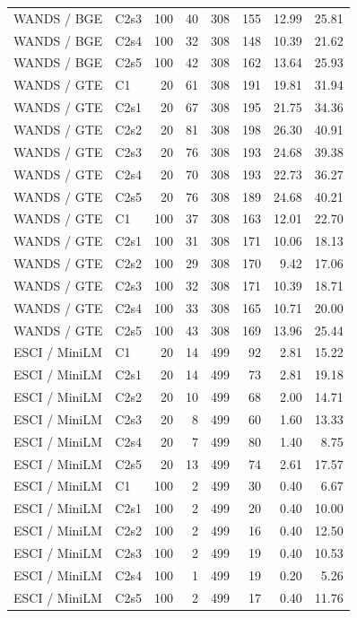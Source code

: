 \begin{longtable}{llrrrrrr}
WANDS / BGE & C2s3 & 100 & 40 & 308 & 155 & 12.99 & 25.81 \\
WANDS / BGE & C2s4 & 100 & 32 & 308 & 148 & 10.39 & 21.62 \\
WANDS / BGE & C2s5 & 100 & 42 & 308 & 162 & 13.64 & 25.93 \\
WANDS / GTE & C1 & 20 & 61 & 308 & 191 & 19.81 & 31.94 \\
WANDS / GTE & C2s1 & 20 & 67 & 308 & 195 & 21.75 & 34.36 \\
WANDS / GTE & C2s2 & 20 & 81 & 308 & 198 & 26.30 & 40.91 \\
WANDS / GTE & C2s3 & 20 & 76 & 308 & 193 & 24.68 & 39.38 \\
WANDS / GTE & C2s4 & 20 & 70 & 308 & 193 & 22.73 & 36.27 \\
WANDS / GTE & C2s5 & 20 & 76 & 308 & 189 & 24.68 & 40.21 \\
WANDS / GTE & C1 & 100 & 37 & 308 & 163 & 12.01 & 22.70 \\
WANDS / GTE & C2s1 & 100 & 31 & 308 & 171 & 10.06 & 18.13 \\
WANDS / GTE & C2s2 & 100 & 29 & 308 & 170 & 9.42 & 17.06 \\
WANDS / GTE & C2s3 & 100 & 32 & 308 & 171 & 10.39 & 18.71 \\
WANDS / GTE & C2s4 & 100 & 33 & 308 & 165 & 10.71 & 20.00 \\
WANDS / GTE & C2s5 & 100 & 43 & 308 & 169 & 13.96 & 25.44 \\
ESCI / MiniLM & C1 & 20 & 14 & 499 & 92 & 2.81 & 15.22 \\
ESCI / MiniLM & C2s1 & 20 & 14 & 499 & 73 & 2.81 & 19.18 \\
ESCI / MiniLM & C2s2 & 20 & 10 & 499 & 68 & 2.00 & 14.71 \\
ESCI / MiniLM & C2s3 & 20 & 8 & 499 & 60 & 1.60 & 13.33 \\
ESCI / MiniLM & C2s4 & 20 & 7 & 499 & 80 & 1.40 & 8.75 \\
ESCI / MiniLM & C2s5 & 20 & 13 & 499 & 74 & 2.61 & 17.57 \\
ESCI / MiniLM & C1 & 100 & 2 & 499 & 30 & 0.40 & 6.67 \\
ESCI / MiniLM & C2s1 & 100 & 2 & 499 & 20 & 0.40 & 10.00 \\
ESCI / MiniLM & C2s2 & 100 & 2 & 499 & 16 & 0.40 & 12.50 \\
ESCI / MiniLM & C2s3 & 100 & 2 & 499 & 19 & 0.40 & 10.53 \\
ESCI / MiniLM & C2s4 & 100 & 1 & 499 & 19 & 0.20 & 5.26 \\
ESCI / MiniLM & C2s5 & 100 & 2 & 499 & 17 & 0.40 & 11.76 \\

\end{longtable}
